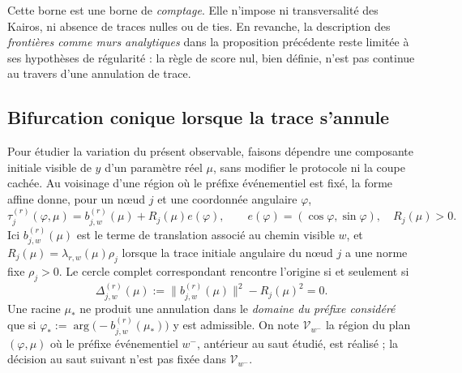 \documentclass[11pt,a4paper]{article}
\theoremstyle{definition}
\theoremstyle{remark}
\begin{document}
Cette borne est une borne de \emph{comptage}. Elle n'impose ni transversalité des Kairos, ni absence de traces nulles ou de ties. En revanche, la description des \emph{frontières comme murs analytiques} dans la proposition précédente reste limitée à ses hypothèses de régularité : la règle de score nul, bien définie, n'est pas continue au travers d'une annulation de trace.

\subsection{Bifurcation conique lorsque la trace s'annule}

Pour étudier la variation du présent observable, faisons dépendre une composante initiale visible de $y$ d'un paramètre réel $\mu$, sans modifier le protocole ni la coupe cachée. Au voisinage d'une région où le préfixe événementiel est fixé, la forme affine donne, pour un nœud $j$ et une coordonnée angulaire $\varphi$,
\[
 \tau_j^{(r)}(\varphi,\mu)
 =b_{j,w}^{(r)}(\mu)+R_j(\mu)e(\varphi),\qquad
 e(\varphi)=(\cos\varphi,\sin\varphi),\quad R_j(\mu)>0.
\]
Ici $b_{j,w}^{(r)}(\mu)$ est le terme de translation associé au chemin visible $w$, et $R_j(\mu)=\lambda_{r,w}(\mu)\rho_j$ lorsque la trace initiale angulaire du nœud $j$ a une norme fixe $\rho_j>0$. Le cercle complet correspondant rencontre l'origine si et seulement si
\[
 \boxed{\Delta_{j,w}^{(r)}(\mu)
 :=\bigl\|b_{j,w}^{(r)}(\mu)\bigr\|^2-R_j(\mu)^2=0.}
\]
Une racine $\mu_*$ ne produit une annulation dans le \emph{domaine du préfixe considéré} que si $\varphi_*:=\arg\!\bigl(-b_{j,w}^{(r)}(\mu_*)\bigr)$ y est admissible. On note $\mathcal V_{w^-}$ la région du plan $(\varphi,\mu)$ où le préfixe événementiel $w^-$, antérieur au saut étudié, est réalisé ; la décision au saut suivant n'est pas fixée dans $\mathcal V_{w^-}$.
\end{document}

